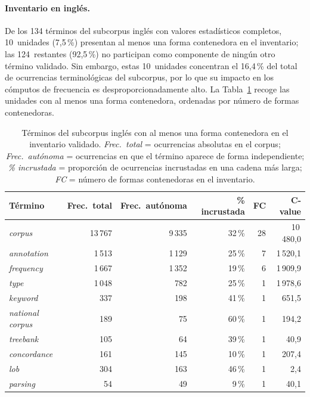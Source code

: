 \paragraph{Inventario en inglés.}
De los 134 términos del subcorpus inglés con valores estadísticos completos, 10~unidades (7,5\,\%) presentan al menos una forma contenedora en el inventario; las 124~restantes (92,5\,\%) no participan como componente de ningún otro término validado. Sin embargo, estas 10~unidades concentran el 16,4\,\% del total de ocurrencias terminológicas del subcorpus, por lo que su impacto en los cómputos de frecuencia es desproporcionadamente alto. La Tabla~\ref{tab:terminos_incrustados_en} recoge las unidades con al menos una forma contenedora, ordenadas por número de formas contenedoras.

\begin{table}[H]
\centering
\small
\setlength{\tabcolsep}{4pt}
\renewcommand{\arraystretch}{1.15}
\caption{Términos del subcorpus inglés con al menos una forma contenedora en el inventario validado. \textit{Frec.\ total} = ocurrencias absolutas en el corpus; \textit{Frec.\ autónoma} = ocurrencias en que el término aparece de forma independiente; \textit{\% incrustada} = proporción de ocurrencias incrustadas en una cadena más larga; \textit{FC} = número de formas contenedoras en el inventario.}
\label{tab:terminos_incrustados_en}
\begin{tabular}{@{} l r r r r r @{}}
\toprule
\textbf{Término} & \textbf{Frec.\ total} & \textbf{Frec.\ autónoma} & \textbf{\% incrustada} & \textbf{FC} & \textbf{C-value} \\
\midrule
\textit{corpus}       & 13\,767 &  9\,335 & 32\,\% & 28 & 10\,480{,}0 \\
\textit{annotation}   &  1\,513 &  1\,129 & 25\,\% &  7 &  1\,520{,}1 \\
\textit{frequency}    &  1\,667 &  1\,352 & 19\,\% &  6 &  1\,909{,}9 \\
\textit{type}         &  1\,048 &    782  & 25\,\% &  1 &  1\,978{,}6 \\
\textit{keyword}      &    337  &    198  & 41\,\% &  1 &    651{,}5 \\
\textit{national corpus} & 189 &     75  & 60\,\% &  1 &    194{,}2 \\
\textit{treebank}     &    105  &     64  & 39\,\% &  1 &     40{,}9 \\
\textit{concordance}  &    161  &    145  & 10\,\% &  1 &    207{,}4 \\
\textit{lob}          &    304  &    163  & 46\,\% &  1 &      2{,}4 \\
\textit{parsing}      &     54  &     49  &  9\,\% &  1 &     40{,}1 \\
\bottomrule
\end{tabular}
\end{table}

